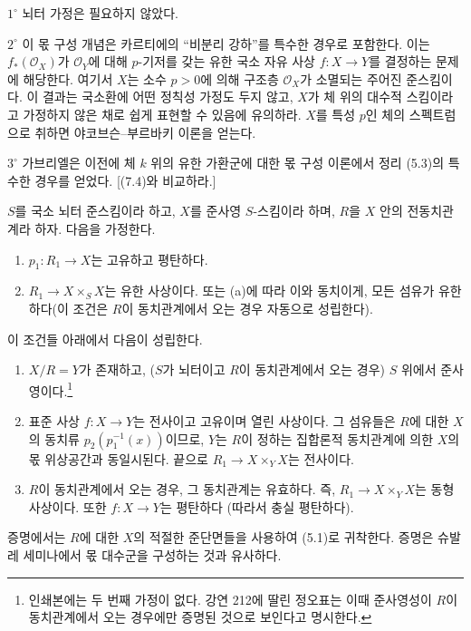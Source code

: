 \smallskip
\noindent $1^\circ$ 뇌터 가정은 필요하지 않았다.

\smallskip
\noindent $2^\circ$ 이 몫 구성 개념은 카르티에의 “비분리 강하”를 특수한
경우로 포함한다. 이는 $f_*(\mathcal O_X)$가 $\mathcal O_Y$에 대해
$p$-기저를 갖는 유한 국소 자유 사상 $f:X\to Y$를 결정하는 문제에
해당한다. 여기서 $X$는 소수 $p>0$에 의해 구조층 $\mathcal O_X$가
소멸되는 주어진 준스킴이다. 이 결과는 국소환에 어떤 정칙성 가정도
두지 않고, $X$가 체 위의 대수적 스킴이라고 가정하지 않은 채로 쉽게
표현할 수 있음에 유의하라. $X$를 특성 $p$인 체의 스펙트럼으로 취하면
야코브슨--부르바키 이론을 얻는다.

\smallskip
\noindent $3^\circ$ 가브리엘은 이전에 체 $k$ 위의 유한 가환군에 대한
몫 구성 이론에서 정리 (5.3)의 특수한 경우를 얻었다. [(7.4)와 비교하라.]


 $S$를 국소 뇌터 준스킴이라 하고, $X$를 준사영
$S$-스킴이라 하며, $R$을 $X$ 안의 전동치관계라 하자. 다음을 가정한다.
\begin{enumerate}
\item[(a)] $p_1:R_1\to X$는 고유하고 평탄하다.
\item[(b)] $R_1\to X\times_S X$는 유한 사상이다. 또는 (a)에 따라 이와
동치이게, 모든 섬유가 유한하다(이 조건은 $R$이 동치관계에서 오는 경우
자동으로 성립한다).
\end{enumerate}
이 조건들 아래에서 다음이 성립한다.
\begin{enumerate}
\item[(i)] $X/R=Y$가 존재하고, ($S$가 뇌터이고 $R$이 동치관계에서 오는
경우) $S$ 위에서 준사영이다.\footnote{인쇄본에는 두 번째 가정이 없다.
강연 212에 딸린 정오표는 이때 준사영성이 $R$이 동치관계에서 오는 경우에만
증명된 것으로 보인다고 명시한다.}

\item[(ii)] 표준 사상 $f:X\to Y$는 전사이고 고유이며 열린 사상이다. 그
섬유들은 $R$에 대한 $X$의 동치류 $p_2(p_1^{-1}(x))$이므로, $Y$는
$R$이 정하는 집합론적 동치관계에 의한 $X$의 몫 위상공간과 동일시된다.
끝으로 $R_1\to X\times_Y X$는 전사이다.

\item[(iii)] $R$이 동치관계에서 오는 경우, 그 동치관계는 유효하다. 즉,
$R_1\to X\times_Y X$는 동형사상이다. 또한 $f:X\to Y$는 평탄하다
(따라서 충실 평탄하다).
\end{enumerate}

증명에서는 $R$에 대한 $X$의 적절한 준단면들을 사용하여 (5.1)로
귀착한다. 증명은 슈발레 세미나에서 몫 대수군을 구성하는 것과 유사하다.

